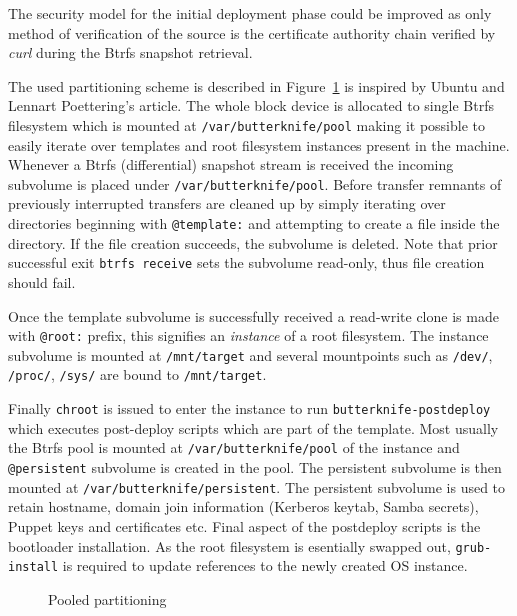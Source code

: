 \documentclass[a4paper,11pt]{kth-mag}
\begin{document}
The security model for the initial deployment phase could be improved
as only method of verification of the source is the certificate
authority chain verified by \emph{curl} during the Btrfs snapshot
retrieval.

The used partitioning scheme is described in Figure~\ref{fig:pooled-partitioning}
is inspired by Ubuntu and Lennart Poettering's article.
The whole block device is allocated to single Btrfs filesystem
which is mounted at \texttt{/var/butterknife/pool} making
it possible to easily iterate over templates and root filesystem instances
present in the machine.
Whenever a Btrfs (differential) snapshot stream is received
the incoming subvolume is placed under \texttt{/var/butterknife/pool}.
Before transfer remnants of previously interrupted transfers are cleaned
up by simply iterating over directories beginning with \texttt{@template:}
and attempting to create a file inside the directory.
If the file creation succeeds, the subvolume is deleted.
Note that prior successful exit \texttt{btrfs receive} sets the
subvolume read-only, thus file creation should fail.

Once the template subvolume is successfully received
a read-write clone is made with \texttt{@root:} prefix,
this signifies an \emph{instance} of a root filesystem.
The instance subvolume is mounted at \texttt{/mnt/target}
and several mountpoints such as \texttt{/dev/},
\texttt{/proc/}, \texttt{/sys/} are bound to \texttt{/mnt/target}.

Finally \texttt{chroot} is issued to enter the instance to
run \texttt{butterknife-postdeploy} which executes
post-deploy scripts which are part of the template.
Most usually the Btrfs pool is mounted at \texttt{/var/butterknife/pool}
of the instance and \texttt{@persistent} subvolume is created
in the pool.
The persistent subvolume is then mounted at \texttt{/var/butterknife/persistent}.
The persistent subvolume is used to retain hostname,
domain join information (Kerberos keytab, Samba secrets),
Puppet keys and certificates etc.
Final aspect of the postdeploy scripts is the 
bootloader installation.
As the root filesystem is esentially swapped out,
\texttt{grub-install} is required to update references
to the newly created OS instance.

\begin{figure}[!htb]
\centering
\scalebox{0.5}{}
\caption{Pooled partitioning}
\label{fig:pooled-partitioning}
\end{figure}
\end{document}
